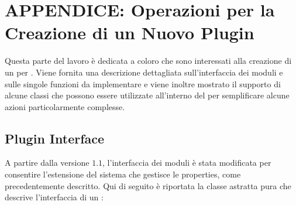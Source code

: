 \chapter*{APPENDICE: Operazioni per la Creazione di un Nuovo Plugin}


\label{appendice_a}


Questa parte del lavoro è dedicata a coloro che sono interessati alla creazione di un \plugin{} per \visualnetkit{}. Viene fornita una descrizione dettagliata sull'interfaccia dei moduli e sulle singole funzioni da implementare e viene inoltre mostrato il supporto di alcune classi che possono essere utilizzate all'interno del \plugin{} per semplificare alcune azioni particolarmente complesse.

\section*{Plugin Interface}
A partire dalla versione $1.1$, l'interfaccia dei moduli è stata modificata per consentire l'estensione del sistema che gestisce le properties, come precedentemente descritto. Qui di seguito è riportata la classe astratta pura che descrive l'interfaccia di un \plugin{}:

